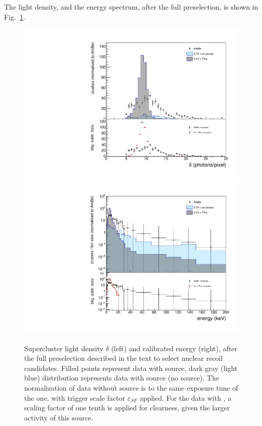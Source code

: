 The light density, and the energy spectrum, after the full
preselection, is shown in Fig.~\ref{fig:presel}.
\begin{figure}[ht]
  \begin{center}
  \includegraphics[width=0.45\linewidth]{figures/density_fullSel}
  \includegraphics[width=0.45\linewidth]{figures/energy_fullSel}

  \caption{Supercluster light density $\delta$ (left) and calibrated
    energy (right), after the full preselection described in the text
    to select nuclear recoil candidates. Filled points represent data
    with \ambe source, dark gray (light blue) distribution represents
    data with \fe source (no source).  The normalization of data
    without source is to the same exposure time of the \ambe one, with
    trigger scale factor $\varepsilon_{SF}$ applied. For the data
    with \fe, a scaling factor of one tenth is applied for clearness,
    given the larger activity of this source.  \label{fig:presel}}

  \end{center}
\end{figure}


